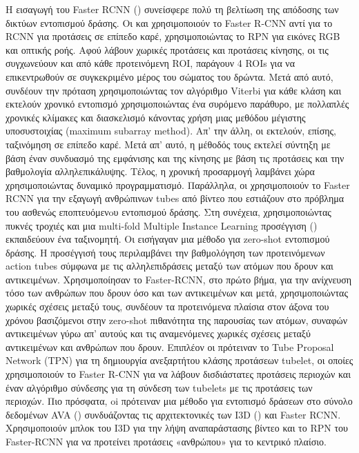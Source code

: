 Η εισαγωγή του \en Faster RCNN (\cite{Ren:2015:FRT:2969239.2969250}) \gr συνείσφερε  πολύ
τη βελτίωση της απόδοσης των δικτύων εντοπισμού δράσης. Οι \en\cite{peng:hal-01349107} \gr και \en\cite{DBLP:journals/corr/SahaSSTC16} \gr 
χρησιμοποιούν το \en Faster R-CNN \gr αντί για το \en  RCNN \gr  για προτάσεις σε επίπεδο καρέ, χρησιμοποιώντας το \en RPN \gr για εικόνες \en RGB \gr και οπτικής ροής.
Αφού λάβουν χωρικές προτάσεις και προτάσεις κίνησης, οι \en \cite{peng:hal-01349107} \gr τις συγχωνεύουν και από κάθε προτεινόμενη \en ROI\gr, παράγουν 4 \en ROIs \gr για να επικεντρωθούν
σε συγκεκριμένο μέρος του σώματος του δρώντα. Μετά από αυτό, συνδέουν την πρόταση χρησιμοποιώντας τον αλγόριθμο \en Viterbi \gr για κάθε κλάση και εκτελούν χρονικό εντοπισμό
χρησιμοποιώντας ένα συρόμενο παράθυρο, με πολλαπλές χρονικές κλίμακες και διασκελισμό κάνοντας χρήση  μιας μεθόδου  μέγιστης υποσυστοιχίας (\en maximum subarray method\gr).
Απ' την άλλη, οι \en \cite{DBLP:journals/corr/SahaSSTC16} \gr εκτελούν, επίσης, ταξινόμηση σε επίπεδο καρέ. Μετά απ' αυτό,  η μέθοδός τους εκτελεί σύντηξη με βάση έναν συνδυασμό
της εμφάνισης και της κίνησης με βάση τις προτάσεις και την βαθμολογία αλληλεπικάλυψης. Τέλος, η χρονική προσαρμογή λαμβάνει χώρα χρησιμοποιώντας δυναμικό προγραμματισμό.
Παράλληλα, οι \en \cite{DBLP:journals/corr/WeinzaepfelMS16} \gr χρησιμοποιούν το \en Faster RCNN \gr
για την εξαγωγή ανθρώπινων \en tubes \gr από βίντεο που εστιάζουν στο πρόβλημα του ασθενώς εποπτευόμενoυ εντοπισμού δράσης.
 Στη συνέχεια, χρησιμοποιώντας πυκνές τροχιές και μια \en multi-fold Multiple  Instance  Learning \gr προσέγγιση \en(\cite{7420739}\gr)  εκπαιδεύουν ένα
 ταξινομητή. Οι \en \cite{DBLP:journals/corr/MettesS17} \gr εισήγαγαν μια μέθοδο για \en zero-shot \gr εντοπισμού δράσης. Η προσέγγισή τους περιλαμβάνει την βαθμολόγηση των προτεινόμενων
 \en action tubes \gr  σύμφωνα με τις αλληλεπιδράσεις μεταξύ των ατόμων που δρουν  και  αντικειμένων. Χρησιμοποίησαν το \en Faster-RCNN\gr,
στο πρώτο βήμα, για την ανίχνευση τόσο των ανθρώπων που δρουν όσο και των αντικειμένων και μετά, χρησιμοποιώντας χωρικές σχέσεις μεταξύ τους,  συνδέουν τα προτεινόμενα πλαίσια στον άξονα του χρόνου
βασιζόμενοι στην \en zero-shot \gr πιθανότητα της παρουσίας των ατόμων, συναφών αντικειμένων γύρω απ' αυτούς και τις αναμενόμενες χωρικές σχέσεις μεταξύ αντικειμένων και ανθρώπων που δρουν. Επιπλέον
οι \en\cite{DBLP:journals/corr/HeIDM17} \gr πρότειναν  το \en Tube Proposal Network (TPN) \gr για τη δημιουργία ανεξαρτήτου κλάσης προτάσεων \en tubelet\gr, οι οποίες χρησιμοποιούν το \en Faster R-CNN \gr
για να λάβουν δισδιάστατες προτάσεις περιοχών και έναν αλγόριθμο σύνδεσης για τη σύνδεση των \en tubelets  \gr με τις  προτάσεις των περιοχών. Πιο πρόσφατα, oi \en \cite{DBLP:journals/corr/abs-1807-10066}
\gr πρότειναν μια μέθοδο για εντοπισμό δράσεων στο σύνολο δεδομένων \en AVA  (\cite{DBLP:journals/corr/GuSVPRTLRSSM17}\gr) συνδυάζοντας τις αρχιτεκτονικές
των \en I3D (\cite{DBLP:journals/corr/CarreiraZ17}\gr) και \en Faster RCNN\gr. Χρησιμοποιούν μπλοκ του \en I3D \gr για την λήψη αναπαράστασης βίντεο και το  \en RPN \gr του \en Faster-RCNN \gr
για να προτείνει προτάσεις «ανθρώπου» για το κεντρικό πλαίσιο. \par

